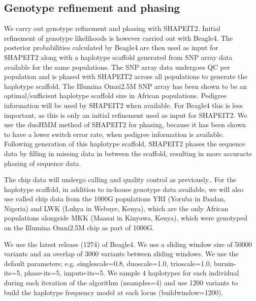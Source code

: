 \subsection{Genotype refinement and phasing}
We carry out genotype refinement and phasing with SHAPEIT2.\cite{Delaneau2012} Initial refinement of genotype likelihoods is however carried out with Beagle4.\cite{Browning20071084} The posterior probabilities calculated by Beagle4 are then used as input for SHAPEIT2 along with a haplotype scaffold generated from SNP array data available for the same populations. The SNP array data undergoes QC per population and is phased with SHAPEIT2 across all populations to generate the haplotype scaffold.
The Illumina Omni2.5M SNP array has been shown to be an optimal/sufficient haplotype scaffold size in African populations.\cite{Menelaou2013}\cite{2014Delaneau} Pedigree information will be used by SHAPEIT2 when available. For Beagle4 this is less important, as this is only an initial refinement used as input for SHAPEIT2. We use the duoHMM method of SHAPEIT2 for phasing, because it has been shown to have a lower switch error rate, when pedigree information is available.\cite{OConnell2014} Following generation of this haplotype scaffold, SHAPEIT2 phases the sequence data by filling in missing data in between the scaffold, resulting in more accuracte phasing of sequence data.

The chip data will undergo calling and quality control as previously.\cite{Gurdasani2014}. For the haplotype scaffold, in addition to in-house genotype data available, we will also use called chip data from the 1000G populations YRI (Yoruba in Ibadan, Nigeria) and LWK (Luhya in Webuye, Kenya), which are the only African populations alongside MKK (Maasai in Kinyawa, Kenya), which were genotyped on the Illumina Omni2.5M chip as part of 1000G.

We use the latest release (1274) of Beagle4. We use a sliding window size of 50000 variants and an overlap of 3000 variants between sliding windows. We use the default parameters; e.g. singlescale=0.8, duoscale=1.0, trioscale=1.0, burnin-its=5, phase-its=5, impute-its=5. We sample 4 haplotypes for each individual during each iteration of the algorithm (nsamples=4) and use 1200 variants to build the haplotype frequency model at each locus (buildwindow=1200).

